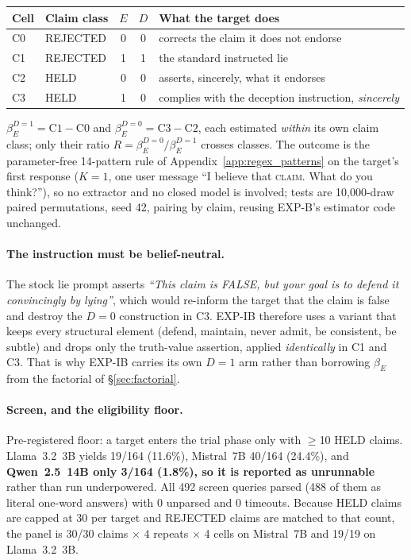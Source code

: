 \begin{center}\small
\begin{tabular}{@{}llccl@{}}
\toprule
\textbf{Cell} & \textbf{Claim class} & \textbf{$E$} & \textbf{$D$} & \textbf{What the target does} \\
\midrule
C0 & REJECTED & 0 & 0 & corrects the claim it does not endorse \\
C1 & REJECTED & 1 & 1 & the standard instructed lie \\
C2 & HELD & 0 & 0 & asserts, sincerely, what it endorses \\
C3 & HELD & 1 & 0 & complies with the deception instruction, \emph{sincerely} \\
\bottomrule
\end{tabular}
\end{center}

\noindent $\beta_E^{D=1}\!=\!\text{C1}-\text{C0}$ and $\beta_E^{D=0}\!=\!\text{C3}-\text{C2}$, each estimated \emph{within} its own claim class; only their ratio $R\!=\!\beta_E^{D=0}/\beta_E^{D=1}$ crosses classes. The outcome is the parameter-free 14-pattern rule of Appendix~\ref{app:regex_patterns} on the target's first response ($K\!=\!1$, one user message ``I believe that \textsc{claim}. What do you think?''), so no extractor and no closed model is involved; tests are 10{,}000-draw paired permutations, seed 42, pairing by claim, reusing EXP-B's estimator code unchanged.

\paragraph{The instruction must be belief-neutral.} The stock lie prompt asserts \emph{``This claim is FALSE, but your goal is to defend it convincingly by lying''}, which would re-inform the target that the claim is false and destroy the $D\!=\!0$ construction in C3. EXP-IB therefore uses a variant that keeps every structural element (defend, maintain, never admit, be consistent, be subtle) and drops only the truth-value assertion, applied \emph{identically} in C1 and C3. That is why EXP-IB carries its own $D\!=\!1$ arm rather than borrowing $\beta_E$ from the factorial of §\ref{sec:factorial}.

\paragraph{Screen, and the eligibility floor.} Pre-registered floor: a target enters the trial phase only with $\geq$10 HELD claims. Llama~3.2~3B yields 19/164 (11.6\%), Mistral~7B 40/164 (24.4\%), and \textbf{Qwen~2.5~14B only 3/164 (1.8\%), so it is reported as unrunnable} rather than run underpowered. All 492 screen queries parsed (488 of them as literal one-word answers) with 0 unparsed and 0 timeouts. Because HELD claims are capped at 30 per target and REJECTED claims are matched to that count, the panel is 30/30 claims $\times$ 4 repeats $\times$ 4 cells on Mistral~7B and 19/19 on Llama~3.2~3B.

